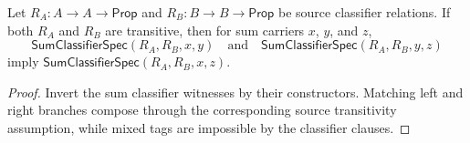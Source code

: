 \begin{theorem}
\label{thm:sum-classifier-transitivity}
Let $R_A : A \to A \to \mathsf{Prop}$ and
$R_B : B \to B \to \mathsf{Prop}$ be source classifier relations.  If both
$R_A$ and $R_B$ are transitive, then for sum carriers $x$, $y$, and $z$,
$$
  \mathsf{SumClassifierSpec}(R_A,R_B,x,y)
  \quad\text{and}\quad
  \mathsf{SumClassifierSpec}(R_A,R_B,y,z)
$$
imply $\mathsf{SumClassifierSpec}(R_A,R_B,x,z)$.
\end{theorem}
\begin{proof}
Invert the sum classifier witnesses by their constructors. Matching left and
right branches compose through the corresponding source transitivity assumption,
while mixed tags are impossible by the classifier clauses.
\end{proof}
